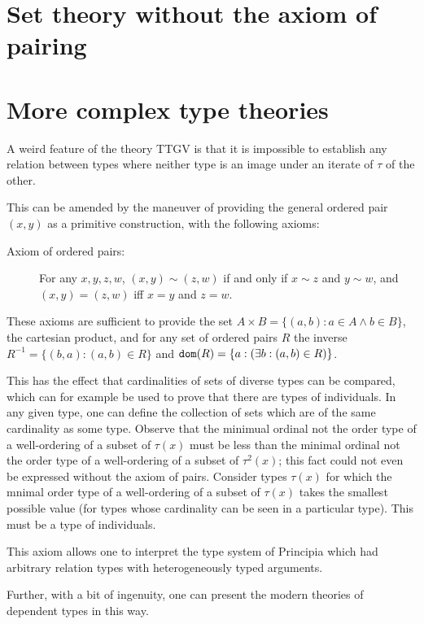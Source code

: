 \documentclass[12pt]{article}
\begin{document}
\section{Set theory without the axiom of pairing}


\section{More complex type theories}

A weird feature of the theory TTGV is that it is impossible to establish any relation between types where neither type is an image under an iterate of $\tau$ of the other.

This can be amended by the maneuver of providing the general ordered pair $(x,y)$ as a primitive construction, with the following axioms:

\begin{description}

\item[Axiom of ordered pairs:]  For any $x,y,z,w$, $(x,y) \sim (z,w)$ if and only if $x \sim z$ and $y\sim w$, and
$(x,y)=(z,w)$ iff $x=y$ and $z=w$.

\end{description}

These axioms are sufficient to provide the set $A \times B = \{(a,b):a \in A \wedge b \in B\}$, the cartesian product,
and for any set of ordered pairs $R$ the inverse $R^{-1} = \{(b,a):(a,b)\in R\}$ and ${\tt dom}(R) = \{a:(\exists b:(a,b)\in R)\}$.

This has the effect that cardinalities of sets of diverse types can be compared, which can for example be used to prove that there are types of individuals.  In any given type, one can define the collection of sets which are of the same cardinality as some type.  Observe that the minimual ordinal not the order type of a well-ordering of a subset of $\tau(x)$ must be less than the minimal ordinal not the order type of a well-ordering of a subset of $\tau^2(x)$;  this fact could not even be expressed without the axiom of pairs.  Consider  types $\tau(x)$ for which the mnimal order type of a well-ordering of a subset of $\tau(x)$ takes the smallest possible value (for types whose cardinality can be seen in a particular type).  This must be a type of individuals.

This axiom allows one to interpret the type system of Principia which had arbitrary relation types with heterogeneously typed arguments.

Further, with a bit of ingenuity, one can present the modern theories of dependent types in this way.
\end{document}
